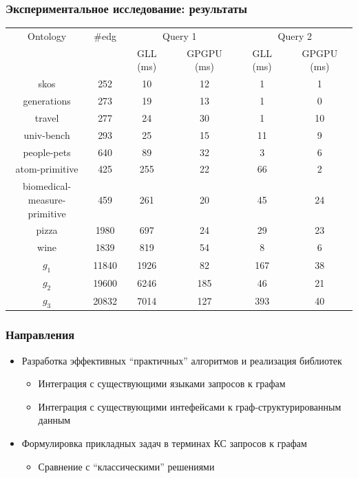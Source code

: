 \documentclass[xcolor=table,aspectratio=169]{beamer}
\begin{document}
\begin{frame}[fragile]
\transwipe[direction=90]
\frametitle{Экспериментальное исследование: результаты}
\centering
{}
\begin{tabular}{  c | c | c | c | c | c }
Ontology & \#edg & \multicolumn{2}{c|}{Query 1} & \multicolumn{2}{c}{Query 2} \\
\cline{3-6}
& & GLL (ms) & GPGPU (ms)  & GLL (ms) & GPGPU (ms) \\
\hline 
\hline
skos        & 252    & 10   & 12  & 1   & 1 \\
generations & 273    & 19   & 13  & 1   & 0 \\
travel      & 277    & 24   & 30  & 1   & 10 \\
univ-bench  & 293    & 25   & 15  & 11  & 9 \\
people-pets & 640    & 89   & 32  & 3   & 6 \\
atom-primitive 
            & 425    & 255  & 22  & 66  & 2 \\
\shortstack{biomedical- \\ measure-primitive} 
            & 459    & 261  & 20  & 45  & 24 \\
pizza       & 1980   & 697  & 24  & 29  & 23 \\
wine        & 1839   & 819  & 54  & 8   & 6 \\
$g_{1}$     & 11840  & 1926 & 82  & 167 & 38\\
$g_{2}$     & 19600  & 6246 & 185 & 46  & 21\\
$g_{3}$     & 20832  & 7014 & 127 & 393 & 40\\

\end{tabular}

\end{frame}

\begin{frame}
  \transwipe[direction=90]
  \frametitle{Направления}

\begin{itemize} 
\item Разработка эффективных ``практичных'' алгоритмов и реализация библиотек
\begin{itemize} 
\item Интеграция с существующими языками запросов к графам
\item Интеграция с существующими интефейсами к граф-структурированным данным
\end{itemize}

\item Формулировка прикладных задач в терминах КС запросов к графам
\begin{itemize} 
\item Сравнение с ``классическими'' решениями
\end{itemize}

\end{itemize}

\end{frame}
\end{document}
